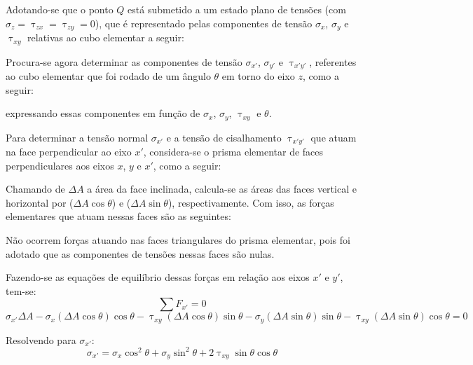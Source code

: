 Adotando-se que o ponto $Q$ está submetido a um estado plano de tensões (com $\sigma_z=\uptau_{zx}=\uptau_{zy}=0$), que é representado pelas componentes de tensão $\sigma_x$, $\sigma_y$ e $\uptau_{xy}$ relativas ao cubo elementar a seguir:

Procura-se agora determinar as componentes de tensão $\sigma_{x'}$, $\sigma_{y'}$ e $\uptau_{x'y'}$, referentes ao cubo elementar que foi rodado de um ângulo $\theta$ em torno do eixo $z$, como a seguir:

expressando essas componentes em função de $\sigma_x$, $\sigma_y$, $\uptau_{xy}$ e $\theta$.

Para determinar a tensão normal $\sigma_{x'}$ e a tensão de cisalhamento $\uptau_{x'y'}$ que atuam na face perpendicular ao eixo $x'$, considera-se o prisma elementar de faces perpendiculares aos eixos $x$, $y$ e $x'$, como a seguir:

Chamando de $\Delta A$ a área da face inclinada, calcula-se as áreas das faces vertical e horizontal por ($\Delta A\cos\theta$) e ($\Delta A\sin\theta$), respectivamente. Com isso, as forças elementares que atuam nessas faces são as seguintes:

Não ocorrem forças atuando nas faces triangulares do prisma elementar, pois foi adotado que as componentes de tensões nessas faces são nulas.

Fazendo-se as equações de equilíbrio dessas forças em relação aos eixos $x'$ e $y'$, tem-se:
$$\sum F_{x'}=0$$
$$\sigma_{x'}\Delta A-\sigma_x(\Delta A\cos\theta)\cos\theta-\uptau_{xy}(\Delta A\cos\theta)\sin\theta-\sigma_y(\Delta A\sin\theta)\sin\theta-\uptau_{xy}(\Delta A\sin\theta)\cos\theta=0$$

Resolvendo para $\sigma_{x'}$:
$$\sigma_{x'}=\sigma_x\cos^2\theta+\sigma_y\sin^2\theta+2\uptau_{xy}\sin\theta\cos\theta$$